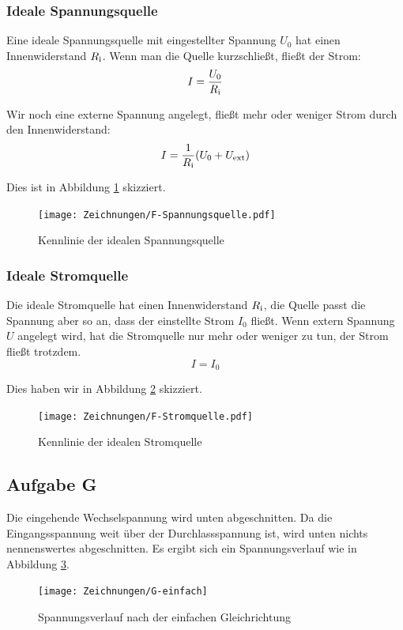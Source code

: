 \subsubsection{Ideale Spannungsquelle}

Eine ideale Spannungsquelle mit eingestellter Spannung $U_0$ hat einen
Innenwiderstand $R_\text i$. Wenn man die Quelle kurzschließt, fließt der
Strom:
\[
	I = \frac{U_0}{R_\text i}
\]

Wir noch eine externe Spannung angelegt, fließt mehr oder weniger Strom durch
den Innenwiderstand:
\[
	I = \frac{1}{R_\text i} (U_0 + U_\text{ext})
\]

Dies ist in Abbildung \ref{fig:F-Spannungsquelle} skizziert.

\begin{figure}[h]
	\centering
	\caption{%
		Kennlinie der idealen Spannungsquelle
	}
	\label{fig:F-Spannungsquelle}
	\texttt{[image: Zeichnungen/F-Spannungsquelle.pdf]}
\end{figure}

\subsubsection{Ideale Stromquelle}

Die ideale Stromquelle hat einen Innenwiderstand $R_\text i$, die Quelle passt
die Spannung aber so an, dass der einstellte Strom $I_0$ fließt. Wenn extern
Spannung $U$ angelegt wird, hat die Stromquelle nur mehr oder weniger zu tun,
der Strom fließt trotzdem.
\[
	I = I_0
\]

Dies haben wir in Abbildung \ref{fig:F-Stromquelle} skizziert.

\begin{figure}[h]
	\centering
	\caption{%
		Kennlinie der idealen Stromquelle
	}
	\label{fig:F-Stromquelle}
	\texttt{[image: Zeichnungen/F-Stromquelle.pdf]}
\end{figure}

\subsection{Aufgabe G}

Die eingehende Wechselspannung wird unten abgeschnitten. Da die
Eingangsspannung weit über der Durchlassspannung ist, wird unten nichts
nennenswertes abgeschnitten. Es ergibt sich ein Spannungsverlauf wie in
Abbildung \ref{fig:G-einfach}.

\begin{figure}[h]
	\centering
	\caption{%
		Spannungsverlauf nach der einfachen Gleichrichtung
	}
	\label{fig:G-einfach}
	\texttt{[image: Zeichnungen/G-einfach]}
\end{figure}

